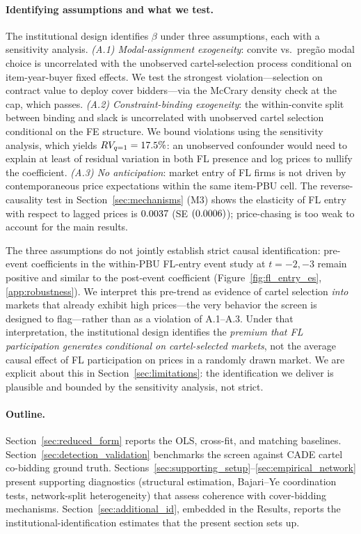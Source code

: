 \paragraph{Identifying assumptions and what we test.}
The institutional design identifies $\beta$ under three
assumptions, each with a sensitivity analysis. \emph{(A.1)
Modal-assignment exogeneity}: convite vs.\ pregão modal choice
is uncorrelated with the unobserved cartel-selection process
conditional on item-year-buyer fixed effects. We test the
strongest violation---selection on contract value to deploy
cover bidders---via the McCrary density check at the \valCapOldR
cap, which passes. \emph{(A.2) Constraint-binding exogeneity}:
the within-convite split between binding and slack is
uncorrelated with unobserved cartel selection conditional on
the FE structure. We bound violations using the
\citet{cinelli2020making} sensitivity analysis, which yields
$RV_{q=1} = 17.5\%$: an unobserved confounder would need to
explain at least \valRVqOne of residual variation in both FL
presence and log prices to nullify the coefficient. \emph{(A.3)
No anticipation}: market entry of FL firms is not driven by
contemporaneous price expectations within the same item-PBU
cell. The reverse-causality test in
Section~\ref{sec:mechanisms} (M3) shows the elasticity of FL
entry with respect to lagged prices is $0.0037$ (SE $(0.0006)$);
price-chasing is too weak to account for the main results.

The three assumptions do not jointly establish strict causal
identification: pre-event coefficients in the within-PBU FL-entry
event study at $t = -2,-3$ remain positive and similar to the
post-event coefficient (Figure~\ref{fig:fl_entry_es},
\ref{app:robustness}). We interpret this pre-trend as evidence
of cartel selection \emph{into} markets that already exhibit
high prices---the very behavior the screen is designed to
flag---rather than as a violation of A.1--A.3. Under that
interpretation, the institutional design identifies the
\emph{premium that FL participation generates conditional on
cartel-selected markets}, not the average causal effect of FL
participation on prices in a randomly drawn market. We are
explicit about this in Section~\ref{sec:limitations}: the
identification we deliver is plausible and bounded by the
sensitivity analysis, not strict.

\paragraph{Outline.}
Section~\ref{sec:reduced_form} reports the OLS, cross-fit, and
matching baselines. Section~\ref{sec:detection_validation}
benchmarks the screen against CADE cartel co-bidding ground
truth. Sections~\ref{sec:supporting_setup}--\ref{sec:empirical_network}
present supporting diagnostics (structural estimation,
Bajari--Ye coordination tests, network-split heterogeneity) that
assess coherence with cover-bidding mechanisms.
Section~\ref{sec:additional_id}, embedded in the Results,
reports the institutional-identification estimates that the
present section sets up.

